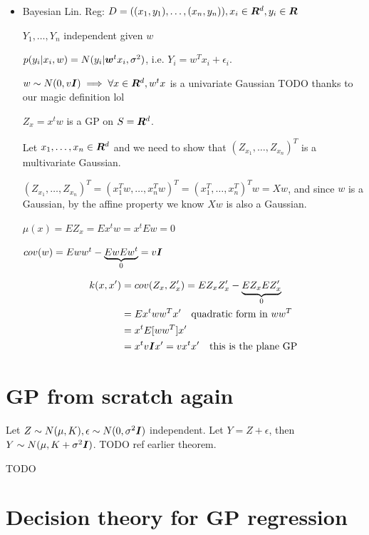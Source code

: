 \begin{itemize}
  \item Bayesian Lin. Reg: $D = ((x_1, y_1), \dots, (x_n, y_n)), x_i \in {\bm{R}}^d, y_i \in {\bm{R}}$

    $Y_1, \dots, Y_n$ independent given $w$

    $p(y_i | x_i, w) = N(y_i | {\bm{w}}^t x_i, \sigma^2)$, i.e. $Y_i = w^T x_i + \epsilon_i$.

    $w \sim N(0, v{\bm{I}}) \implies \forall x \in {\bm{R}}^d, w^t x$ is a univariate
    Gaussian {TODO thanks to our magic definition lol}

    $Z_x = x^t w$ is a GP on $S = {\bm{R}}^d$.

    Let $x_1, \dots, x_n \in {\bm{R}}^d$ and we need to show that $(Z_{x_1}, \dots,
    Z_{x_n})^T$ is a multivariate Gaussian.

    $(Z_{x_1}, \dots, Z_{x_n})^T = (x^T_1 w, \dots, x^T_n w)^T = (x^T_1, \dots,
    x^T_n)^T w = X w$, and since $w$ is a Gaussian, by the affine property we
    know $X w$ is also a Gaussian.

    $\mu(x) = E Z_x = E x^t w = x^t E w = 0$

    $cov(w) = E w w^t - \underbrace{E w E w^t}_0 = v {\bm{I}}$

    \begin{align}
      k(x, x') &= cov(Z_x, Z_x') = E Z_x Z_x' - \underbrace{E Z_x E Z_x'}_0 \\
               &= E x^t w w^T x' \quad \text{quadratic form in } w w^T \\
               &= x^t E[w w^T] x' \\
               &= x^t v {\bm{I}} x' = v x^t x' \quad \text{this is the plane GP}
    \end{align}
\end{itemize}

\section{GP from scratch again}

Let $Z \sim N(\mu, K), \epsilon \sim N(0, \sigma^2 {\bm{I}})$ independent. Let $Y =
Z + \epsilon$, then $Y \sim N(\mu, K + \sigma^2 {\bm{I}})$. {TODO ref earlier
theorem}.

TODO

\section{Decision theory for GP regression}

